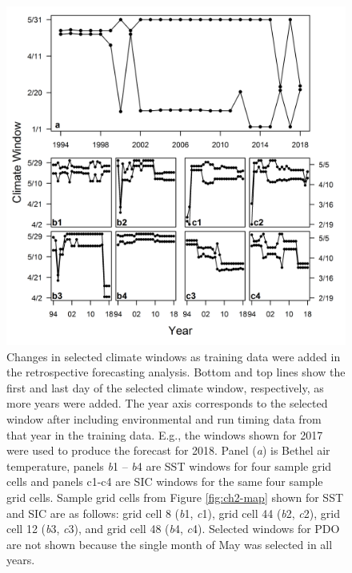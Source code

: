\documentclass[12pt,]{book}
\theoremstyle{definition}
\theoremstyle{definition}
\theoremstyle{definition}
\theoremstyle{remark}
\begin{document}
\begin{figure}
  \centering
  \includegraphics{img/Ch2/window-changes.png}
  \caption{Changes in selected climate windows as training data were added in the retrospective forecasting analysis. Bottom and top lines show the first and last day of the selected climate window, respectively, as more years were added. The year axis corresponds to the selected window after including environmental and run timing data from that year in the training data. E.g., the windows shown for 2017 were used to produce the forecast for 2018. Panel (\textit{a}) is Bethel air temperature, panels \textit{b}1 -- \textit{b}4 are SST windows for four sample grid cells and panels c1-c4 are SIC windows for the same four sample grid cells. Sample grid cells from Figure \ref{fig:ch2-map} shown for SST and SIC are as follows: grid cell 8 (\textit{b}1, \textit{c}1), grid cell 44 (\textit{b}2, \textit{c}2), grid cell 12 (\textit{b}3, \textit{c}3), and grid cell 48 (\textit{b}4, \textit{c}4). Selected windows for PDO are not shown because the single month of May was selected in all years.}
  \label{fig:window-changes}
\end{figure}

\clearpage
\end{document}
